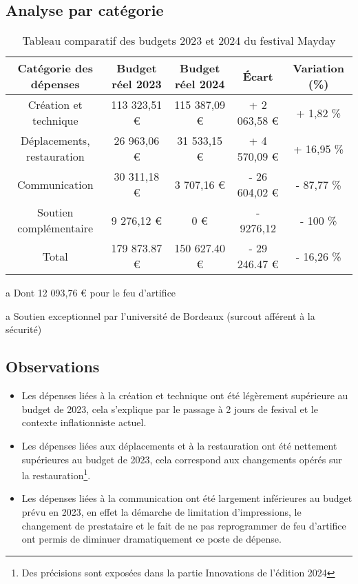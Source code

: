 \documentclass[12pt,a4paper]{report}
\begin{document}
\subsection{Analyse par catégorie}
\begin{center}
\begin{table}[h!]
\begin{threeparttable}
\begin{tabular}{|c|c|c|c|c|}
\hline
Catégorie des dépenses & Budget réel 2023 & Budget réel 2024 & Écart & Variation (\%) \\
\hline
Création et technique & 113 323,51 € & 115 387,09 € & + 2 063,58 € & + 1,82 \% \\
Déplacements, restauration & 26 963,06 € & 31 533,15 € & + 4 570,09 € & + 16,95 \% \\
Communication & 30 311,18 €\tnote{a} & 3 707,16 € & - 26 604,02 € & - 87,77 \% \\
Soutien complémentaire\tnote{b} & 9 276,12 € & 0 € & - 9276,12 & - 100 \%\\
\hline
Total & 179 873.87 € & 150 627.40 € & - 29 246.47 € & - 16,26 \%\\
\hline
\end{tabular}
\caption{Tableau comparatif des budgets 2023 et 2024 du festival Mayday}
\begin{tablenotes}
   \item[a] Dont 12 093,76 € pour le feu d'artifice
   \item[a] Soutien exceptionnel par l'université de Bordeaux (surcout afférent à la sécurité)
\end{tablenotes}
\end{threeparttable}
\end{table}
\end{center}

\subsection{Observations}
\begin{itemize}
\item Les dépenses liées à la création et technique ont été légèrement supérieure au budget de 2023, cela s'explique par le passage à 2 jours de fesival et le contexte inflationniste actuel.
\item Les dépenses liées aux déplacements et à la restauration ont été nettement supérieures au budget de 2023, cela correspond aux changements opérés sur la restauration\footnote{Des précisions sont exposées dans la partie \og Innovations de l'édition 2024 \fg{}}.
\item Les dépenses liées à la communication ont été largement inférieures au budget prévu en 2023, en effet la démarche de limitation d'impressions, le changement de prestataire et le fait de ne pas reprogrammer de feu d'artifice ont permis de diminuer dramatiquement ce poste de dépense.\\
\end{itemize}
\end{document}
